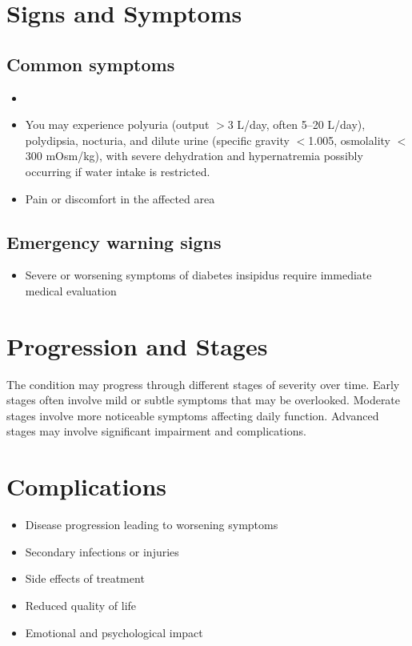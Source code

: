 \section{Signs and Symptoms}

\subsection{Common symptoms}
\begin{itemize}[noitemsep]
  \item \item You may experience polyuria (output $>$3 L/day, often 5--20 L/day), polydipsia, nocturia, and dilute urine (specific gravity $<$1.005, osmolality $<$300 mOsm/kg), with severe dehydration and hypernatremia possibly occurring if water intake is restricted.

  \item Pain or discomfort in the affected area
  \end{itemize}

\subsection{Emergency warning signs}
\begin{itemize}[noitemsep]
  \item Severe or worsening symptoms of diabetes insipidus require immediate medical evaluation
\end{itemize}
\section{Progression and Stages}
The condition may progress through different stages of severity over time. Early stages often involve mild or subtle symptoms that may be overlooked. Moderate stages involve more noticeable symptoms affecting daily function. Advanced stages may involve significant impairment and complications.
\section{Complications}
\begin{itemize}[noitemsep]
  \item Disease progression leading to worsening symptoms
  \item Secondary infections or injuries
  \item Side effects of treatment
  \item Reduced quality of life
  \item Emotional and psychological impact
\end{itemize}
